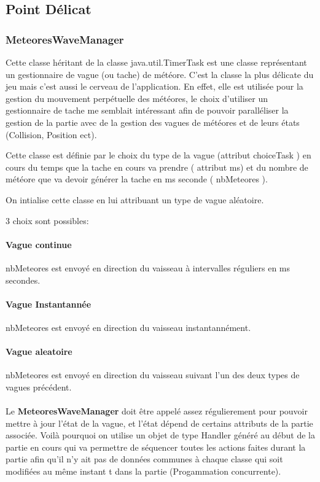 \documentclass{article}
\begin{document}
\subsection{Point Délicat}
\subsubsection{MeteoresWaveManager}
\parabraph{}Cette classe héritant de la classe java.util.TimerTask est une classe représentant un gestionnaire de vague (ou tache) de météore.
\parabraph{}C'est la classe la plus délicate du jeu mais c'est aussi le cerveau de l'application. En effet, elle est utilisée pour la gestion du mouvement perpétuelle des météores, le choix d'utiliser un gestionnaire de tache me semblait intéressant afin de pouvoir paralléliser la gestion de la partie avec de la gestion des vagues de météores et de leurs états (Collision, Position ect). 

\parabraph{}Cette classe est définie par le choix du type de la vague (attribut choiceTask ) en cours du temps que la tache en cours va prendre ( attribut ms) et du nombre de météore que va devoir générer la tache en ms seconde ( nbMeteores ).

\parabraph{}On intialise cette classe en lui attribuant un type de vague aléatoire. 

3 choix sont possibles: 

\paragraph{Vague continue}nbMeteores est envoyé en direction du vaisseau à intervalles réguliers en ms secondes.
\paragraph{Vague Instantannée}nbMeteores est envoyé en direction du vaisseau instantannément.
\paragraph{Vague aleatoire}nbMeteores est envoyé en direction du vaisseau suivant l'un des deux types de vagues précédent.

\paragraph{}
Le \textbf{MeteoresWaveManager} doit être appelé assez régulierement pour pouvoir mettre à jour l'état de la vague, et l'état dépend de certains attributs de la partie associée. Voilà pourquoi on utilise un objet de type Handler généré au début de la partie en cours qui va permettre de séquencer toutes les actions faites durant la partie afin qu'il n'y ait pas de données communes à chaque classe qui soit modifiées au même instant t dans la partie (Progammation concurrente).
\end{document}
